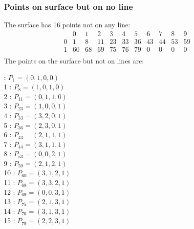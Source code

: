 \documentclass{article}
\begin{document}
{\subsubsection*{Points on surface but on no line}
The surface has 16 points not on any line:\\
$$
\begin{array}{r|*{10}{r}}
 & 0 & 1 & 2 & 3 & 4 & 5 & 6 & 7 & 8 & 9\\
\hline
0 & 1 & 8 & 11 & 23 & 33 & 36 & 43 & 44 & 53 & 59\\
1 & 60 & 68 & 69 & 75 & 76 & 79 & 0 & 0 & 0 & 0\\
\end{array}
$$
The points on the surface but not on lines are:\\
\begin{multicols}{2}
 : $P_{1}=( 0, 1, 0, 0 )$\\
1 : $P_{8}=( 1, 0, 1, 0 )$\\
2 : $P_{11}=( 0, 1, 1, 0 )$\\
3 : $P_{23}=( 1, 0, 0, 1 )$\\
4 : $P_{33}=( 3, 2, 0, 1 )$\\
5 : $P_{36}=( 2, 3, 0, 1 )$\\
6 : $P_{43}=( 2, 1, 1, 1 )$\\
7 : $P_{44}=( 3, 1, 1, 1 )$\\
8 : $P_{53}=( 0, 0, 2, 1 )$\\
9 : $P_{59}=( 2, 1, 2, 1 )$\\
10 : $P_{60}=( 3, 1, 2, 1 )$\\
11 : $P_{68}=( 3, 3, 2, 1 )$\\
12 : $P_{69}=( 0, 0, 3, 1 )$\\
13 : $P_{75}=( 2, 1, 3, 1 )$\\
14 : $P_{76}=( 3, 1, 3, 1 )$\\
15 : $P_{79}=( 2, 2, 3, 1 )$\\
\end{multicols}
}
\end{document}
